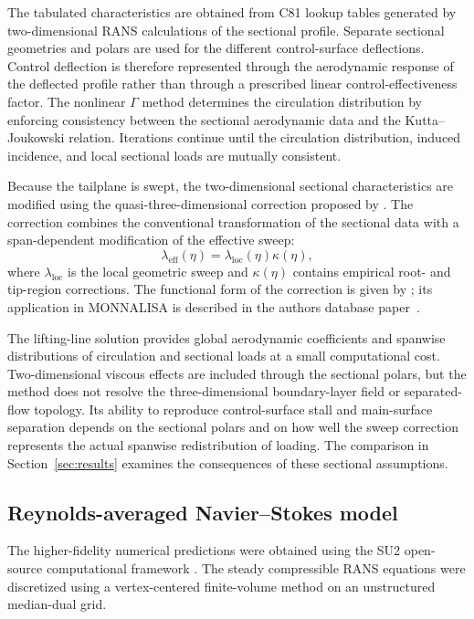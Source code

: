 \documentclass[journal ]{new-aiaa}
\begin{document}
The tabulated characteristics are obtained from C81 lookup tables generated by two-dimensional RANS calculations of the sectional profile. Separate sectional geometries and polars are used for the different control-surface deflections. Control deflection is therefore represented through the aerodynamic response of the deflected profile rather than through a prescribed linear control-effectiveness factor.
The nonlinear $\Gamma$ method determines the circulation distribution by enforcing consistency between the sectional aerodynamic data and the Kutta--Joukowski relation. Iterations continue until the circulation distribution, induced incidence, and local sectional loads are mutually consistent.

Because the tailplane is swept, the two-dimensional sectional characteristics are modified using the quasi-three-dimensional correction proposed by \citet{GoitiaLlamas2019}. The correction combines the conventional transformation of the sectional data with a span-dependent modification of the effective sweep:
%
\begin{equation}
\lambda_{\mathrm{eff}}(\eta)
=
\lambda_{\mathrm{loc}}(\eta)
\kappa(\eta),
\label{eq:effective_sweep}
\end{equation}
%
where $\lambda_{\mathrm{loc}}$ is the local geometric sweep and $\kappa(\eta)$ contains empirical root- and tip-region corrections. The functional form of the correction is given by \citet{GoitiaLlamas2019}; its application in MONNALISA is described in the authors\textquotesingle{} database paper~\citep{rausa2026monnalisa}.

The lifting-line solution provides global aerodynamic coefficients and spanwise distributions of circulation and sectional loads at a small computational cost. Two-dimensional viscous effects are included through the sectional polars, but the method does not resolve the three-dimensional boundary-layer field or separated-flow topology. Its ability to reproduce control-surface stall and main-surface separation depends on the sectional polars and on how well the sweep correction represents the actual spanwise redistribution of loading. The comparison in Section~\ref{sec:results} examines the consequences of these sectional assumptions.

\subsection{Reynolds-averaged Navier--Stokes model}
\label{sec:rans}

The higher-fidelity numerical predictions were obtained using the SU2 open-source computational framework \citep{palacios2013stanford}. The steady compressible RANS equations were discretized using a vertex-centered finite-volume method on an unstructured median-dual grid.
\end{document}
